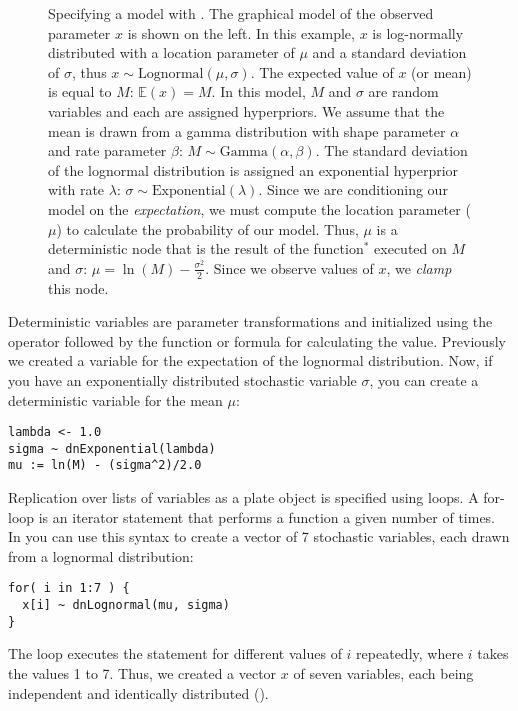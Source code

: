 \begin{figure}[h!]
\centering
{}
\caption{\small Specifying a model with \Rev. 
The graphical model of the observed parameter $x$ is shown on the left. 
In this example, $x$ is log-normally distributed with a location parameter of $\mu$ and a standard deviation of $\sigma$, thus $x \sim \mbox{Lognormal}(\mu, \sigma)$. 
The expected value of $x$ (or mean) is equal to $M$: $\mathbb{E}(x) = M$. 
In this model, $M$ and $\sigma$ are random variables and each are assigned hyperpriors. 
We assume that the mean is drawn from a gamma distribution with shape parameter $\alpha$ and rate parameter $\beta$: $M \sim \mbox{Gamma}(\alpha, \beta)$. 
The standard deviation of the lognormal distribution is assigned an exponential hyperprior with rate $\lambda$: $\sigma \sim \mbox{Exponential}(\lambda)$. 
Since we are conditioning our model on the \emph{expectation}, we must compute the location parameter ($\mu$) to 
calculate the probability of our model. 
Thus, $\mu$ is a deterministic node that is the result of the function$^*$ executed on $M$ and $\sigma$: $\mu = \ln(M) - \frac{\sigma^2}{2}$. 
Since we observe values of $x$, we \emph{clamp} this node.
}
\label{revgmexample}
\end{figure}

Deterministic variables are parameter transformations and initialized using the \cl{:=} operator followed by the function or formula for calculating the value. 
Previously we created a variable for the expectation of the lognormal distribution.
Now, if you have an exponentially distributed stochastic variable $\sigma$, you can create a deterministic variable for the mean $\mu$:
{\tt \begin{snugshade*}
\begin{lstlisting}
lambda <- 1.0
sigma ~ dnExponential(lambda)
mu := ln(M) - (sigma^2)/2.0
\end{lstlisting}
\end{snugshade*}}

Replication over lists of variables as a plate object is specified using  loops. 
A for-loop is an iterator statement that performs a function a given number of times. 
In \Rev you can use this syntax to create a vector of 7 stochastic variables, each drawn from a lognormal distribution:
{\tt \begin{snugshade*}
\begin{lstlisting}
for( i in 1:7 ) {
  x[i] ~ dnLognormal(mu, sigma)
}
\end{lstlisting}
\end{snugshade*}}
The  loop executes the statement  for different values of $i$ repeatedly, where $i$ takes the values 1 to 7.
Thus, we created a vector $x$ of seven variables, each being independent and identically distributed (\IID).


